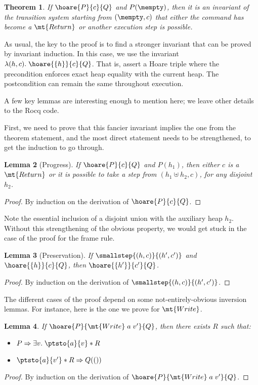 \documentclass{amsbook}
\newtheorem{theorem}{Theorem}[chapter]
\newtheorem{lemma}[theorem]{Lemma}
\theoremstyle{definition}
\theoremstyle{remark}
\numberwithin{section}{chapter}
\numberwithin{equation}{chapter}
\begin{document}
\invariants
\begin{theorem}
  If $\hoare{P}{c}{Q}$ and $P(\mempty)$, then it is an invariant of the transition system starting from $(\mempty, c)$ that either the command has become a $\mt{Return}$ or another execution step is possible.
\end{theorem}

As usual, the key to the proof is to find a stronger invariant that can be proved by invariant induction.
In this case, we use the invariant $\lambda (h, c). \; \hoare{\{h\}}{c}{Q}$.
That is, assert a Hoare triple where the precondition enforces exact heap equality with the current heap.
The postcondition can remain the same throughout execution.

A few key lemmas are interesting enough to mention here; we leave other details to the Rocq code.

First, we need to prove that this fancier invariant implies the one from the theorem statement, and the most direct statement needs to be strengthened, to get the induction to go through.

\begin{lemma}[Progress]
  If $\hoare{P}{c}{Q}$ and $P(h_1)$, then either $c$ is a $\mt{Return}$ or it is possible to take a step from $(h_1 \uplus h_2, c)$, for any disjoint $h_2$.
\end{lemma}
\begin{proof}
  By induction on the derivation of $\hoare{P}{c}{Q}$.
\end{proof}

Note the essential inclusion of a disjoint union with the auxiliary heap $h_2$.
Without this strengthening of the obvious property, we would get stuck in the case of the proof for the frame rule.

\begin{lemma}[Preservation]
  If $\smallstep{(h, c)}{(h', c')}$ and $\hoare{\{h\}}{c}{Q}$, then $\hoare{\{h'\}}{c'}{Q}$.
\end{lemma}
\begin{proof}
  By induction on the derivation of $\smallstep{(h, c)}{(h', c')}$.
\end{proof}

The different cases of the proof depend on some not-entirely-obvious inversion lemmas.
For instance, here is the one we prove for $\mt{Write}$.

\begin{lemma}
  If $\hoare{P}{\mt{Write} \; a \; v'}{Q}$, then there exists $R$ such that:
  \begin{itemize}
  \item $P \Rightarrow \exists v. \; \ptsto{a}{v} * R$
  \item $\ptsto{a}{v'} * R \Rightarrow Q(())$
  \end{itemize}
\end{lemma}
\begin{proof}
  By induction on the derivation of $\hoare{P}{\mt{Write} \; a \; v'}{Q}$.
\end{proof}
\end{document}
